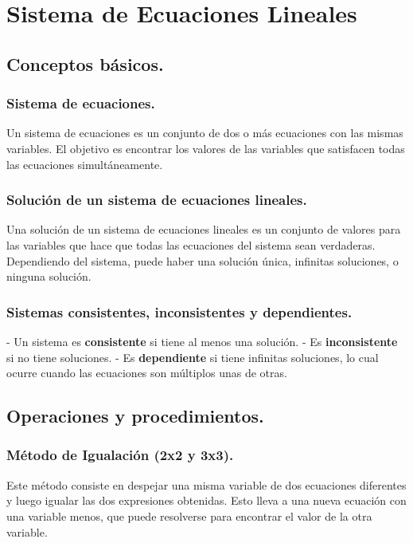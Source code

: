 \section{Sistema de Ecuaciones Lineales} %

\subsection{Conceptos básicos.}
\subsubsection{Sistema de ecuaciones.}
Un sistema de ecuaciones es un conjunto de dos o más ecuaciones con las mismas variables. El objetivo es encontrar los valores de las variables que satisfacen todas las ecuaciones simultáneamente.

\subsubsection{Solución de un sistema de ecuaciones lineales.}
Una solución de un sistema de ecuaciones lineales es un conjunto de valores para las variables que hace que todas las ecuaciones del sistema sean verdaderas. Dependiendo del sistema, puede haber una solución única, infinitas soluciones, o ninguna solución.

\subsubsection{Sistemas consistentes, inconsistentes y dependientes.}
- Un sistema es \textbf{consistente} si tiene al menos una solución.
- Es \textbf{inconsistente} si no tiene soluciones.
- Es \textbf{dependiente} si tiene infinitas soluciones, lo cual ocurre cuando las ecuaciones son múltiplos unas de otras.

\subsection{Operaciones y procedimientos.}

\subsubsection{Método de Igualación (2x2 y 3x3).}
Este método consiste en despejar una misma variable de dos ecuaciones diferentes y luego igualar las dos expresiones obtenidas. Esto lleva a una nueva ecuación con una variable menos, que puede resolverse para encontrar el valor de la otra variable.

